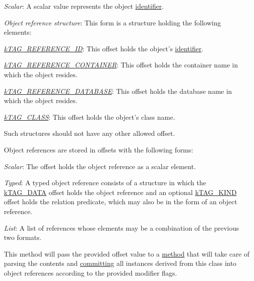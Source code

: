 \begin{DoxyItemize}
\item {\itshape Scalar}\-: A scalar value represents the object \hyperlink{}{identifier}. 
\item {\itshape Object reference structure}\-: This form is a structure holding the following elements\-: 
\begin{DoxyItemize}
\item {\itshape \hyperlink{}{k\-T\-A\-G\-\_\-\-R\-E\-F\-E\-R\-E\-N\-C\-E\-\_\-\-I\-D}}\-: This offset holds the object's \hyperlink{}{identifier}. 
\item {\itshape \hyperlink{}{k\-T\-A\-G\-\_\-\-R\-E\-F\-E\-R\-E\-N\-C\-E\-\_\-\-C\-O\-N\-T\-A\-I\-N\-E\-R}}\-: This offset holds the container name in which the object resides. 
\item {\itshape \hyperlink{}{k\-T\-A\-G\-\_\-\-R\-E\-F\-E\-R\-E\-N\-C\-E\-\_\-\-D\-A\-T\-A\-B\-A\-S\-E}}\-: This offset holds the database name in which the object resides. 
\item {\itshape \hyperlink{}{k\-T\-A\-G\-\_\-\-C\-L\-A\-S\-S}}\-: This offset holds the object's class name. 
\end{DoxyItemize}Such structures should not have any other allowed offset. 
\end{DoxyItemize}

Object references are stored in offsets with the following forms\-:


\begin{DoxyItemize}
\item {\itshape Scalar}\-: The offset holds the object reference as a scalar element. 
\item {\itshape Typed}\-: A typed object reference consists of a structure in which the \hyperlink{}{k\-T\-A\-G\-\_\-\-D\-A\-T\-A} offset holds the object reference and an optional \hyperlink{}{k\-T\-A\-G\-\_\-\-K\-I\-N\-D} offset holds the relation predicate, which may also be in the form of an object reference. 
\item {\itshape List}\-: A list of references whose elements may be a combination of the previous two formats. 
\end{DoxyItemize}

This method will pass the provided offset value to a \hyperlink{class_c_persistent_unit_object_ac5766758d07f7ee985fd2699b8d99fce}{method} that will take care of parsing the contents and \hyperlink{}{committing} all instances derived from this class into object references according to the provided modifier flags.

